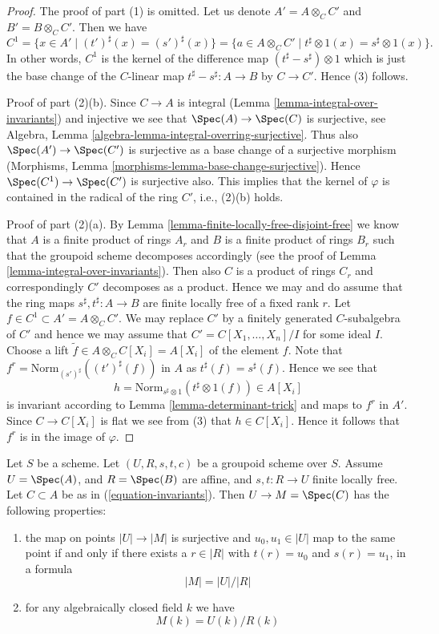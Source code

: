 \begin{proof}
The proof of part (1) is omitted. Let us denote $A' = A \otimes_C C'$ and
$B' = B \otimes_C C'$. Then we have
$$
C^1
= \{x \in A' \mid (t')^\sharp(x) = (s')^\sharp(x) \}
= \{a \in A \otimes_C C' \mid t^\sharp \otimes 1(x) = s^\sharp \otimes 1(x) \}.
$$
In other words, $C^1$ is the kernel of the difference map
$(t^\sharp - s^\sharp) \otimes 1$ which is just the base change
of the $C$-linear map $t^\sharp - s^\sharp : A \to B$ by $C \to C'$.
Hence (3) follows.

\medskip\noindent
Proof of part (2)(b). Since $C \to A$ is integral
(Lemma \ref{lemma-integral-over-invariants}) and injective we see that
$\Spec(A) \to \Spec(C)$ is surjective, see
Algebra, Lemma \ref{algebra-lemma-integral-overring-surjective}.
Thus also $\Spec(A') \to \Spec(C')$ is surjective
as a base change of a surjective morphism
(Morphisms, Lemma \ref{morphisms-lemma-base-change-surjective}).
Hence $\Spec(C^1) \to \Spec(C')$ is surjective also.
This implies that the kernel of $\varphi$ is contained in the
radical of the ring $C'$, i.e., (2)(b) holds.

\medskip\noindent
Proof of part (2)(a). By Lemma \ref{lemma-finite-locally-free-disjoint-free}
we know that $A$ is a finite
product of rings $A_r$ and $B$ is a finite product of rings $B_r$
such that the groupoid scheme decomposes accordingly (see the proof
of Lemma \ref{lemma-integral-over-invariants}).
Then also $C$ is a product of rings $C_r$ and
correspondingly $C'$ decomposes as a product. Hence we may and do
assume that the ring maps $s^\sharp, t^\sharp : A \to B$ are finite
locally free of a fixed rank $r$. Let $f \in C^1 \subset A' = A \otimes_C C'$.
We may replace $C'$ by a finitely generated $C$-subalgebra of $C'$
and hence we may assume that $C' = C[X_1, \ldots, X_n]/I$ for some
ideal $I$. Choose a lift $\tilde f \in A \otimes_C C[X_i] = A[X_i]$
of the element $f$. Note that
$f^r = \text{Norm}_{(s')^\sharp}((t')^\sharp(f))$ in $A$ as
$t^\sharp(f) = s^\sharp(f)$. Hence we see that
$$
h = \text{Norm}_{s^\sharp \otimes 1}(t^\sharp \otimes 1(f)) \in A[X_i]
$$
is invariant according to Lemma \ref{lemma-determinant-trick}
and maps to $f^r$ in $A'$.
Since $C \to C[X_i]$ is flat we see from (3) that $h \in C[X_i]$.
Hence it follows that $f^r$ is in the image of $\varphi$.
\end{proof}

\begin{lemma}
\label{lemma-points}
Let $S$ be a scheme. Let $(U, R, s, t, c)$ be a groupoid scheme over $S$.
Assume $U = \Spec(A)$, and $R = \Spec(B)$ are affine, and
$s, t : R \to U$ finite locally free. Let $C \subset A$ be as in
(\ref{equation-invariants}). Then $U \to M = \Spec(C)$ has
the following properties:
\begin{enumerate}
\item the map on points $|U| \to |M|$ is surjective and
$u_0, u_1 \in |U|$ map to the same point if and only if
there exists a $r \in |R|$ with $t(r) = u_0$ and $s(r) = u_1$, in
a formula
$$
|M| = |U|/|R|
$$
\item for any algebraically closed field $k$ we have
$$
M(k) = U(k)/R(k)
$$
\end{enumerate}
\end{lemma}

